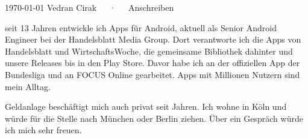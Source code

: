 \documentclass[11pt, a4paper]{awesome-cv}
\begin{document}
\makecvheader[R]

\makecvfooter
  {\today}
  {Vedran Cirak~~~·~~~Anschreiben}
  {}

\makelettertitle

\begin{cvletter}

seit 13 Jahren entwickle ich Apps für Android, aktuell als Senior Android Engineer bei der Handelsblatt Media Group. Dort verantworte ich die Apps von Handelsblatt und WirtschaftsWoche, die gemeinsame Bibliothek dahinter und unsere Releases bis in den Play Store. Davor habe ich an der offiziellen App der Bundesliga und an FOCUS Online gearbeitet. Apps mit Millionen Nutzern sind mein Alltag.

Geldanlage beschäftigt mich auch privat seit Jahren. Ich wohne in Köln und würde für die Stelle nach München oder Berlin ziehen. Über ein Gespräch würde ich mich sehr freuen.

\end{cvletter}


\makeletterclosing
\end{document}
